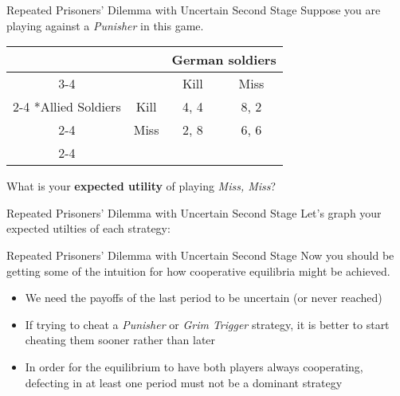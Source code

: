 \begin{frame}{Repeated Prisoners' Dilemma with Uncertain Second Stage}
  Suppose you are playing against a \textit{Punisher} in this game. 

  \begin{center}
    \begin{tabular}{*{4}{c|}}
      \multicolumn{2}{c}{} & \multicolumn{2}{c}{German soldiers} \\ \cline{3-4}
      \multicolumn{1}{c}{} &    & Kill & Miss \\ \cline{2-4}
      \multirow{2}*{Allied Soldiers} & Kill & 4, 4 & 8, 2 \\ \cline{2-4}
                         & Miss & 2, 8 & 6, 6 \\ \cline{2-4} 
    \end{tabular} 
  \end{center}

  What is your \textbf{expected utility} of playing \textit{Miss, Miss}?
  \vspace{10mm}
\end{frame}

\begin{frame}{Repeated Prisoners' Dilemma with Uncertain Second Stage}
  Let's graph your expected utilties of each strategy:
\end{frame}

\begin{frame}{Repeated Prisoners' Dilemma with Uncertain Second Stage}
  Now you should be getting some of the intuition for how cooperative equilibria might be achieved.
  \begin{itemize}
    \item We need the payoffs of the last period to be uncertain (or never reached)
    \item If trying to cheat a \textit{Punisher} or \textit{Grim Trigger} strategy, 
    it is better to start cheating them sooner rather than later
    \item In order for the equilibrium to have both players always cooperating,
    defecting in at least one period must not be a dominant strategy
  \end{itemize}
\end{frame}

